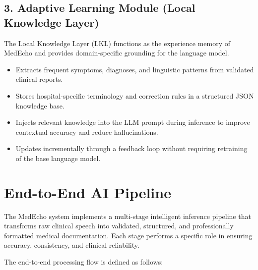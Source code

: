\subsection*{3. Adaptive Learning Module (Local Knowledge Layer)}

The Local Knowledge Layer (LKL) functions as the experience memory of MedEcho and provides domain-specific grounding for the language model.

\begin{itemize}
    \item Extracts frequent symptoms, diagnoses, and linguistic patterns from validated clinical reports.
    \item Stores hospital-specific terminology and correction rules in a structured JSON knowledge base.
    \item Injects relevant knowledge into the LLM prompt during inference to improve contextual accuracy and reduce hallucinations.
    \item Updates incrementally through a feedback loop without requiring retraining of the base language model.
\end{itemize}

\section{End-to-End AI Pipeline}
\label{sec:impl:endtoend}

The MedEcho system implements a multi-stage intelligent inference pipeline that transforms raw clinical speech into validated, structured, and professionally formatted medical documentation. Each stage performs a specific role in ensuring accuracy, consistency, and clinical reliability.

The end-to-end processing flow is defined as follows:

